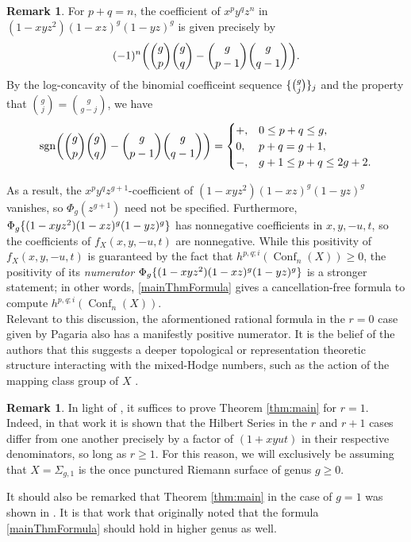 \documentclass[11pt,reqno]{amsproc}
\numberwithin{equation}{section}
\theoremstyle{definition}
\newtheorem{remark}[theorem]{Remark}
\theoremstyle{remark}
\DeclarePairedDelimiter{\set}{\{}{\}}
\DeclarePairedDelimiter{\parens}{\lparen}{\rparen}
\DeclareMathOperator{\Conf}{Conf}
\begin{document}
\begin{remark} \label{rmk:positiveNum}
    For $p+q=n$, the coefficient of $x^py^qz^n$ in $(1-xyz^2)(1-xz)^g(1-yz)^g$ is given precisely by
    \begin{align*}
        (-1)^n \parens*{\binom{g}{p}\binom{g}{q} -\binom{g}{p-1}\binom{g}{q-1}}.
    \end{align*}
    By the log-concavity of the binomial coefficeint sequence $\set{\binom{g}{j}}_j$ and the property that $\binom{g}{j}=\binom{g}{g-j}$, we have
    \begin{equation*}
        \mathrm{sgn}\parens*{\binom{g}{p}\binom{g}{q} -\binom{g}{p-1}\binom{g}{q-1}} = \begin{cases}
            +,& 0\leq p+q\leq g,\\
            0,& p+q=g+1,\\
            -,& g+1\leq p+q\leq 2g+2.
        \end{cases}
    \end{equation*}
    
    As a result, the $x^p y^q z^{g+1}$-coefficient of $(1-xyz^2)(1-xz)^g(1-yz)^g$ vanishes, so $\Phi_g(z^{g+1})$ need not be specified. Furthermore, $\Phi_g\set{(1-xyz^2)(1-xz)^g(1-yz)^g}$ has nonnegative coefficients in $x,y,-u,t$, so the coefficients of $f_X(x,y,-u,t)$ are nonnegative. While this positivity of $f_X(x,y,-u,t)$ is guaranteed by the fact that $h^{p,q;i}(\Conf_n(X))\geq 0$, the positivity of its \emph{numerator} $\Phi_g\set{(1-xyz^2)(1-xz)^g(1-yz)^g}$ is a stronger statement; in other words, \eqref{mainThmFormula} gives a cancellation-free formula to compute $h^{p,q;i}(\Conf_n(X))$.\\

    Relevant to this discussion, the aformentioned rational formula in the $r = 0$ case given by Pagaria \cite{pagaria2020cohomology} also has a manifestly positive numerator. It is the belief of the authors that this suggests a deeper topological or representation theoretic structure interacting with the mixed-Hodge numbers, such as the action of the mapping class group of $X$ \cite{bianchi2022mapping}.
\end{remark}

\begin{remark}
In light of \cite{huang2020cohomology}, it suffices to prove Theorem \ref{thm:main} for $r=1$. Indeed, in that work it is shown that the Hilbert Series in the $r$ and $r+1$ cases differ from one another precisely by a factor of $(1+xyut)$ in their respective denominators, so long as $r \geq 1$. For this reason, we will exclusively be assuming that $X = \Sigma_{g,1}$ is the once punctured Riemann surface of genus $g \geq 0$.

It should also be remarked that Theorem \ref{thm:main} in the case of $g = 1$ was shown in \cite{cheonghuang2022betti}. It is that work that originally noted that the formula \eqref{mainThmFormula} should hold in higher genus as well.
\end{remark}
\end{document}
